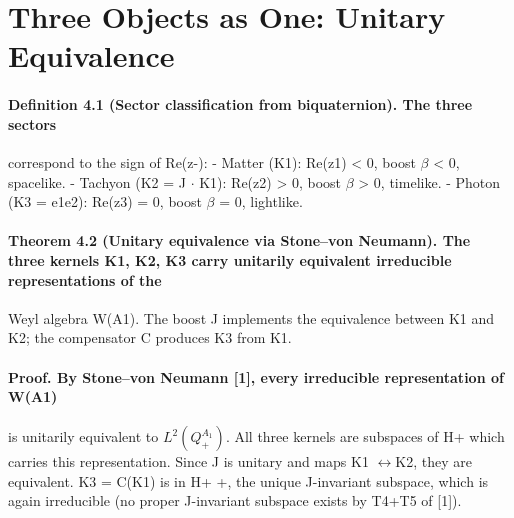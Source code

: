 \section{Three Objects as One: Unitary Equivalence}
\paragraph*{Definition 4.1 (Sector classification from biquaternion). The three sectors}
correspond to the sign of Re(z-):
- Matter (K1): Re(z1) < 0, boost $\beta$ < 0, spacelike.
- Tachyon (K2 = J $\cdot$ K1): Re(z2) > 0, boost $\beta$ > 0, timelike.
- Photon (K3 = e1e2): Re(z3) = 0, boost $\beta$ = 0, lightlike.
\paragraph*{Theorem 4.2 (Unitary equivalence via Stone--von Neumann). The three kernels K1, K2, K3 carry unitarily equivalent irreducible representations of the}
Weyl algebra W(A1). The boost J implements the equivalence between K1 and K2; the compensator C produces K3 from K1.
\paragraph*{Proof. By Stone--von Neumann [1], every irreducible representation of W(A1)}
is unitarily equivalent to $L^2(Q_+^{A_1})$. All three kernels are subspaces of H+ which carries this representation. Since J is unitary and maps K1 $\leftrightarrow$K2, they are equivalent. K3 = C(K1) is in H+ +, the unique J-invariant subspace, which is again irreducible (no proper J-invariant subspace exists by T4+T5 of [1]).

